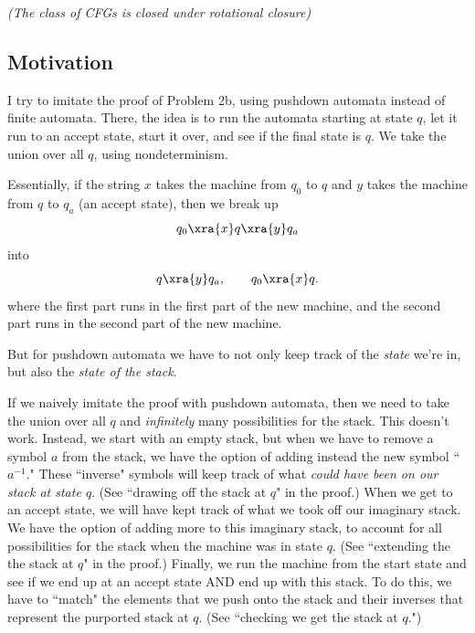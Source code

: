 \pagebreak

\begin{problem}{\it(The class of CFGs is closed under rotational closure)}
\subsection{Motivation}
I try to imitate the proof of Problem 2b, using pushdown automata instead of finite automata. There, the idea is to run the automata starting at state $q$, let it run to an accept state, start it over, and see if the final state is $q$. We take the union over all $q$, using nondeterminism.

Essentially, if the string $x$ takes the machine from $q_0$ to $q$ and $y$ takes the machine from $q$ to $q_a$ (an accept state), then we break up
\begin{equation}\label{eq:404pset-7-a}
q_0\xra{x} q\xra{y}q_a
\end{equation}
into
\begin{equation}\label{eq:404pset-7-b}
q\xra{y} q_a,\qquad q_0\xra{x} q.
\end{equation}
where the first part runs in the first part of the new machine, and the second part runs in the second part of the new machine.
 
But for pushdown automata we have to not only keep track of the {\it state} we're in, but also the {\it state of the stack}.

If we naively imitate the proof with pushdown automata, then we need to take the union over all $q$ and {\it infinitely} many possibilities for the stack. This doesn't work. Instead, we start with an empty stack, but when we have to remove a symbol $a$ from the stack, we have the option of adding instead the new symbol ``$a^{-1}$." These ``inverse" symbols will keep track of what {\it could have been on our stack at state $q$}. (See ``drawing off the stack at $q$" in the proof.) When we get to an accept state, we will have kept track of what we took off our imaginary stack. We have the option of adding more to this imaginary stack, to account for all possibilities for the stack when the machine was in state $q$. (See ``extending the  the stack at $q$" in the proof.) Finally, we run the machine from the start state and see if we end up at an accept state AND end up with this stack. To do this, we have to ``match" the elements that we push onto the stack and their inverses that represent the purported stack at $q$. (See ``checking we get the stack at $q$.")


\end{problem}
